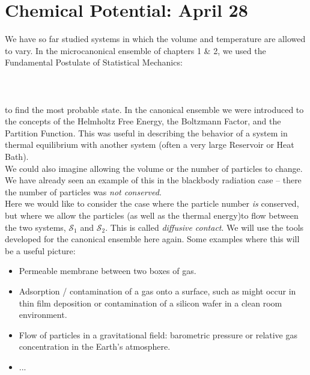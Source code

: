 \section{Chemical Potential: April 28}
We have so far studied systems in which the volume and temperature are allowed to vary. In the microcanonical ensemble of chapters 1 \& 2, we used the Fundamental Postulate of Statistical Mechanics:\\
\\
\\
\\
to find the most probable state. In the canonical ensemble we were introduced to the concepts of the Helmholtz Free Energy, the Boltzmann Factor, and the Partition Function. This was useful in describing the behavior of a system in thermal equilibrium with another system (often a very large Reservoir or Heat Bath).\\

We could also imagine allowing the volume or the number of particles to change. We have already seen an example of this in the blackbody radiation case -- there the number of particles was \textit{not conserved}.\\

Here we would like to consider the case where the particle number \emph{is} conserved, but where we allow the particles (as well as the thermal energy)to flow between the two systems, $\mathcal{S}_1$ and $\mathcal{S}_2$. 
This is called \textit{diffusive contact}. 
We will use the tools developed for the canonical ensemble here again.
Some examples where this will be a useful picture:
\begin{itemize}
\item Permeable membrane between two boxes of gas.
\item Adsorption / contamination of a gas onto a surface, such as might occur in thin film deposition or contamination of a silicon wafer in a clean room environment.
\item Flow of particles in a gravitational field: barometric pressure or relative gas concentration in the Earth's atmosphere.
\item ...
\end{itemize}



